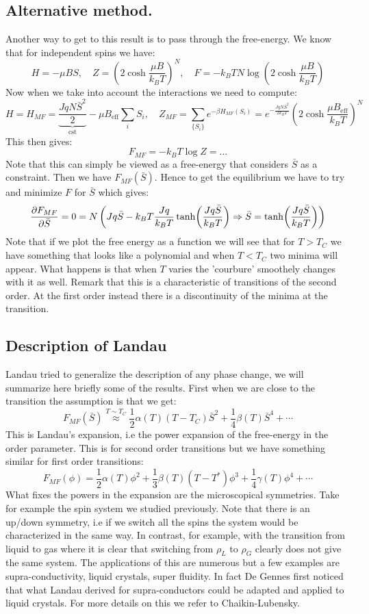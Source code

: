 \documentclass[10pt,a4paper]{book}
\begin{document}
\subsection{Alternative method.}
Another way to get to this result is to pass through the free-energy. We know that for independent spins we have:
\[
H = -\mu B S, \quad Z = \left(2 \cosh \frac{\mu B}{k_B T}\right)^N, \quad F = -k_B T N \log(2\cosh\frac{\mu B}{k_B T})
\]
Now when we take into account the interactions we need to compute:
\[
H = H_{MF} = \underbrace{\frac{J q N \bar{S}^2}{2}}_{\text{cst}} - \mu B_\text{eff} \sum_i S_i, \quad Z_{MF} = \sum_{\{S_i\}} e^{-\beta H_{MF}(S_i)} = e^{-\frac{Jq N \bar{S}^2}{2 k_B T}} \left(2 \cosh \frac{\mu B_\text{eff}}{k_B T}\right)^N 
\]
This then gives:
\[
F_{MF}  = -k_B T\log Z = ...
\]
Note that this can simply be viewed as a free-energy that considers $\bar{S}$ as a constraint. Then we have $F_{MF}(\bar{S})$. Hence to get the equilibrium we have to try and minimize $F$ for $\bar{S}$ which gives:
\[
\pdv{F_{MF}}{\bar{S}} = 0 = N\left(J q \bar{S} - k_B T \frac{J q}{k_B T} \tanh(\frac{J q \bar{S}}{k_B T}) \Rightarrow \bar{S} = \tanh (\frac{J q \bar{S}}{k_B T})\right)
\]
Note that if we plot the free energy as a function we will see that for $T > T_C$ we have something that looks like a polynomial and when $T < T_C$ two minima will appear. What happens is that when $T$ varies the 'courbure' smoothely changes with it as well. Remark that this is a characteristic of transitions of the second order. At the first order instead there is a discontinuity of the minima at the transition.

\subsection{Description of Landau}
Landau tried to generalize the description of any phase change, we will summarize here briefly some of the results. First when we are close to the transition the assumption is that we get:
\[
F_{MF}(\bar{S}) \stackrel{T \sim T_C}{\approx} \frac{1}{2} \alpha(T) (T - T_C) \bar{S}^2 + \frac{1}{4} \beta(T) \bar{S}^4 + \cdots
\]
This is Landau's expansion, i.e the power expansion of the free-energy in the order parameter. This is for second order transitions but we have something similar for first order transitions:
\[
F_{MF}(\phi) = \frac{1}{2} \alpha(T) \phi^2 + \frac{1}{3} \beta(T) (T - T^*) \phi^3 + \frac{1}{4} \gamma(T) \phi^4 + \cdots 
\]
What fixes the powers in the expansion are the microscopical symmetries. Take for example the spin system we studied previously. Note that there is an up/down symmetry, i.e if we switch all the spins the system would be characterized in the same way. In contrast, for example, with the transition from liquid to gas where it is clear that switching from $\rho_L$ to $\rho_G$ clearly does not give the same system. The applications of this are numerous but a few examples are supra-conductivity, liquid crystals, super fluidity. In fact De Gennes first noticed that what Landau derived for supra-conductors could be adapted and applied to liquid crystals. For more details on this we refer to Chaikin-Lubensky.
\end{document}

